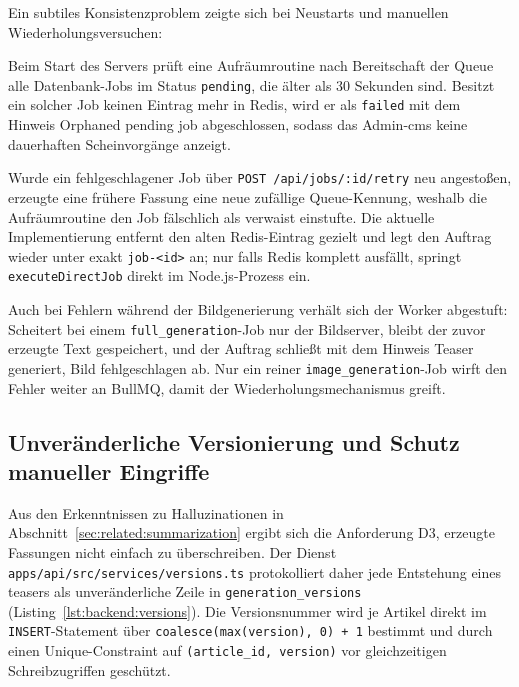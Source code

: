Ein subtiles Konsistenzproblem zeigte sich bei Neustarts und manuellen Wiederholungsversuchen:
\begin{compactitem}
    \item Beim Start des Servers prüft eine Aufräumroutine nach Bereitschaft der Queue alle Datenbank-Jobs im Status \texttt{pending}, die älter als 30 Sekunden sind. Besitzt ein solcher Job keinen Eintrag mehr in Redis, wird er als \texttt{failed} mit dem Hinweis \glqq Orphaned pending job\grqq{} abgeschlossen, sodass das Admin-\gls{cms} keine dauerhaften Scheinvorgänge anzeigt.
    \item Wurde ein fehlgeschlagener Job über \texttt{POST /api/jobs/:id/retry} neu angestoßen, erzeugte eine frühere Fassung eine neue zufällige Queue-Kennung, weshalb die Aufräumroutine den Job fälschlich als verwaist einstufte. Die aktuelle Implementierung entfernt den alten Redis-Eintrag gezielt und legt den Auftrag wieder unter exakt \texttt{job-<id>} an; nur falls Redis komplett ausfällt, springt \texttt{executeDirectJob} direkt im Node.js-Prozess ein.
\end{compactitem}

Auch bei Fehlern während der Bildgenerierung verhält sich der Worker abgestuft:
Scheitert bei einem \texttt{full\_generation}-Job nur der Bildserver, bleibt der zuvor erzeugte Text gespeichert, und der Auftrag schließt mit dem Hinweis \glqq Teaser generiert, Bild fehlgeschlagen\grqq{} ab.
Nur ein reiner \texttt{image\_generation}-Job wirft den Fehler weiter an BullMQ, damit der Wiederholungsmechanismus greift.

\subsection{Unveränderliche Versionierung und Schutz manueller Eingriffe}

Aus den Erkenntnissen zu Halluzinationen in Abschnitt~\ref{sec:related:summarization} ergibt sich die Anforderung D3, erzeugte Fassungen nicht einfach zu überschreiben.
Der Dienst \texttt{apps/api/src/services/versions.ts} protokolliert daher jede Entstehung eines \gls{teaser}s als unveränderliche Zeile in \texttt{generation\_versions} (Listing~\ref{lst:backend:versions}).
Die Versionsnummer wird je Artikel direkt im \texttt{INSERT}-Statement über \texttt{coalesce(max(version), 0) + 1} bestimmt und durch einen Unique-Constraint auf \texttt{(article\_id, version)} vor gleichzeitigen Schreibzugriffen geschützt.

